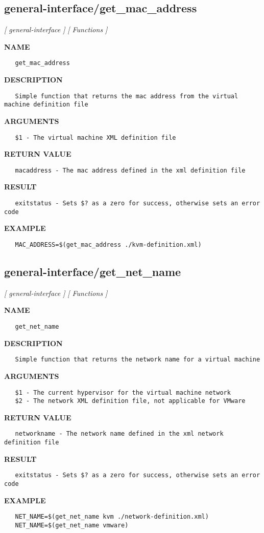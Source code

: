 \subsection{general-interface/get\_mac\_address}
\textsl{[ general-interface ]}
\textsl{[ Functions ]}

\label{ch:robo34}
\label{ch:general_interface_get_mac_address}
\textbf{NAME}
\begin{verbatim}
   get_mac_address
\end{verbatim}
\textbf{DESCRIPTION}
\begin{verbatim}
   Simple function that returns the mac address from the virtual machine definition file
\end{verbatim}
\textbf{ARGUMENTS}
\begin{verbatim}
   $1 - The virtual machine XML definition file
\end{verbatim}
\textbf{RETURN VALUE}
\begin{verbatim}
   macaddress - The mac address defined in the xml definition file
\end{verbatim}
\textbf{RESULT}
\begin{verbatim}
   exitstatus - Sets $? as a zero for success, otherwise sets an error code
\end{verbatim}
\textbf{EXAMPLE}
\begin{verbatim}
   MAC_ADDRESS=$(get_mac_address ./kvm-definition.xml)
\end{verbatim}
\newpage
\subsection{general-interface/get\_net\_name}
\textsl{[ general-interface ]}
\textsl{[ Functions ]}

\label{ch:robo35}
\label{ch:general_interface_get_net_name}
\textbf{NAME}
\begin{verbatim}
   get_net_name
\end{verbatim}
\textbf{DESCRIPTION}
\begin{verbatim}
   Simple function that returns the network name for a virtual machine
\end{verbatim}
\textbf{ARGUMENTS}
\begin{verbatim}
   $1 - The current hypervisor for the virtual machine network
   $2 - The network XML definition file, not applicable for VMware
\end{verbatim}
\textbf{RETURN VALUE}
\begin{verbatim}
   networkname - The network name defined in the xml network definition file
\end{verbatim}
\textbf{RESULT}
\begin{verbatim}
   exitstatus - Sets $? as a zero for success, otherwise sets an error code
\end{verbatim}
\textbf{EXAMPLE}
\begin{verbatim}
   NET_NAME=$(get_net_name kvm ./network-definition.xml)
   NET_NAME=$(get_net_name vmware)
\end{verbatim}
\newpage
